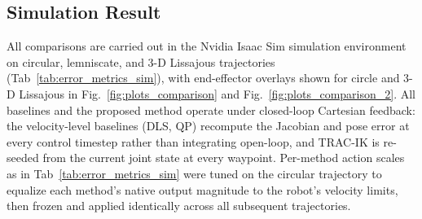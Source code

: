 \documentclass[preprint,12pt]{elsarticle}
\begin{document}
\subsection{Simulation Result}
\label{sim_result}
All comparisons are carried out in the Nvidia Isaac Sim simulation
environment on circular, lemniscate, and 3-D Lissajous trajectories
(Tab~\ref{tab:error_metrics_sim}), with end-effector overlays shown for circle and 3-D Lissajous in Fig.~\ref{fig:plots_comparison} and Fig.~\ref{fig:plots_comparison_2}. All baselines and the proposed method operate under closed-loop Cartesian feedback: the velocity-level baselines (DLS, QP) recompute the Jacobian and pose error at every control timestep
rather than integrating open-loop, and TRAC-IK is re-seeded from the
current joint state at every waypoint. Per-method action scales as in Tab~\ref{tab:error_metrics_sim} were tuned on the circular trajectory to equalize each method's native output magnitude to the robot's velocity limits, then frozen and applied identically across all subsequent trajectories.
\end{document}
